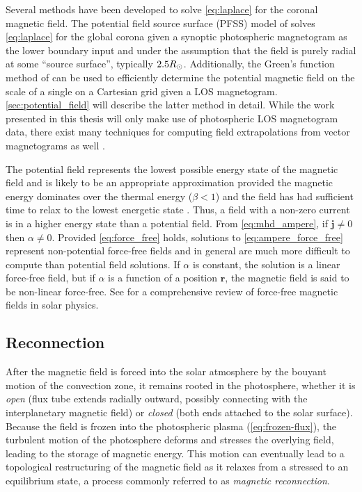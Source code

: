 Several methods have been developed to solve \autoref{eq:laplace} for the coronal magnetic field. The potential field source surface (PFSS) model of \citet{schatten_model_1969} solves \autoref{eq:laplace} for the global corona given a synoptic photospheric magnetogram as the lower boundary input and under the assumption that the field is purely radial at some ``source surface'', typically $2.5R_{\odot}$. Additionally, the Green's function method of \citet{schmidt_observable_1964} can be used to efficiently determine the potential magnetic field on the scale of a single \AR{} on a Cartesian grid given a LOS magnetogram. \autoref{sec:potential_field} will describe the latter method in detail. While the work presented in this thesis will only make use of photospheric LOS magnetogram data, there exist many techniques for computing field extrapolations from vector magnetograms as well \citep[see review by][]{welsch_deriving_2016}.

The potential field represents the lowest possible energy state of the magnetic field and is likely to be an appropriate approximation provided the magnetic energy dominates over the thermal energy ($\beta<1$) and the field has had sufficient time to relax to the lowest energetic state \citep{priest_magnetohydrodynamics_2014}. Thus, a field with a non-zero current is in a higher energy state than a potential field. From \autoref{eq:mhd_ampere}, if $\mathbf{j}\neq0$ then $\alpha\neq0$. Provided \autoref{eq:force_free} holds, solutions to \autoref{eq:ampere_force_free} represent non-potential force-free fields and in general are much more difficult to compute than potential field solutions. If $\alpha$ is constant, the solution is a linear force-free field, but if $\alpha$ is a function of a position $\mathbf{r}$, the magnetic field is said to be non-linear force-free. See \citet{wiegelmann_solar_2012} for a comprehensive review of force-free magnetic fields in solar physics.

\subsection{Reconnection}\label{sec:reconnection}

After the magnetic field is forced into the solar atmosphere by the bouyant motion of the convection zone, it remains rooted in the photosphere, whether it is \textit{open} (flux tube extends radially outward, possibly connecting with the interplanetary magnetic field) or \textit{closed} (both ends attached to the solar surface). Because the field is frozen into the photospheric plasma (\autoref{eq:frozen-flux}), the turbulent motion of the photosphere deforms and stresses the overlying field, leading to the storage of magnetic energy. This motion can eventually lead to a topological restructuring of the magnetic field as it relaxes from a stressed to an equilibrium state, a process commonly referred to as \textit{magnetic reconnection}.

